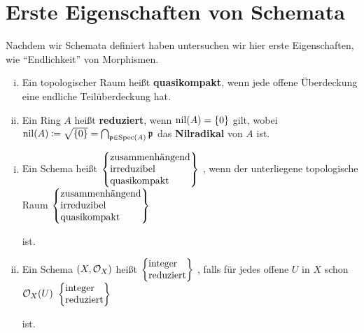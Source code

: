 
\chapter{Erste Eigenschaften von Schemata}
\label{chapter:6}

Nachdem wir Schemata definiert haben untersuchen wir hier erste Eigenschaften, wie \enquote{Endlichkeit} von Morphismen.

\begin{eri}
\label{eri:6.1}
	\begin{enumerate}[i)]
		\item Ein topologischer Raum heißt \textbf{quasikompakt}, wenn jede offene Überdeckung eine endliche Teilüberdeckung hat.
		\item Ein Ring $A$ heißt \textbf{reduziert}, wenn $\operatorname{nil}(A) = \{0\}$ gilt, wobei $\operatorname{nil}(A) \coloneqq \sqrt{\{0\}} = \bigcap_{\mathfrak{p} \in \operatorname{Spec}(A)} \mathfrak{p}$ das \textbf{Nilradikal} von $A$ ist.
	\end{enumerate}
\end{eri}

\begin{defn}
\label{defn:6.2}
	\begin{enumerate}[i)]
                \newcommand{\multitext}[1]{%
                $\left\{\begin{tabular}{@{}l@{}}%
                    #1
                \end{tabular} \right\}$%
                }
		\item Ein Schema heißt
                \multitext{%
			zusammenhängend\\
			irreduzibel\\
			quasikompakt},
		wenn der unterliegene topologische Raum
                \multitext{%
			zusammenhängend\\
			irreduzibel\\
                        quasikompakt}
                ist.
		\item Ein Schema $(X, \mathcal{O}_X)$ heißt
                \multitext{%
			integer\\
			reduziert},
		falls für jedes offene $U$ in $X$ schon $\mathcal{O}_X(U)$
                \multitext{%
			integer\\
			reduziert}
		ist.
	\end{enumerate}
\end{defn}

